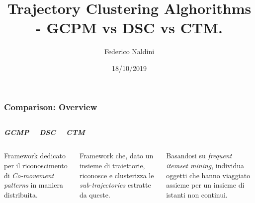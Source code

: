 \documentclass{beamer}
\title[Trajectory Clustering Comparison]{Trajectory Clustering Alghorithms - GCPM vs DSC vs CTM. } %
\author{Federico Naldini} %
\institute[Università di Bologna] %
{
Alma Mater Studiorum - Università di Bologna, Cesena. \\ %
\medskip
\textit{federico.naldini3@studio.unibo.it} %
}
\date{18/10/2019} %
\begin{document}
\begin{frame}
\titlepage %
\end{frame}


\begin{frame}
	\frametitle{Comparison: Overview}
	\begin{columns}
		
		\begin{center}
			\textbf{\textit{\huge{GCMP}}}
			
		\end{center}
		
		\begin{center}
			\textbf{\textit{\huge{DSC}}}
			
		\end{center}
		
		\begin{center}
			\textbf{\textit{\huge{CTM}}}
			
		\end{center}
	\end{columns}
	\begin{columns}
		
		\column{.3\columnwidth}
		
	Framework dedicato per il riconoscimento di \textit{Co-movement patterns} in maniera distribuita.
		
		
		\column{.3\textwidth}
	
			Framework che, dato un insieme di traiettorie, riconosce e clusterizza le \textit{sub-trajectories} estratte da queste.
		
		\column{.3\textwidth}
		
		Basandosi su \textit{frequent itemset mining}, individua oggetti  che hanno viaggiato assieme per un insieme di istanti non continui.

	\end{columns}
\end{frame}     
\end{document}
